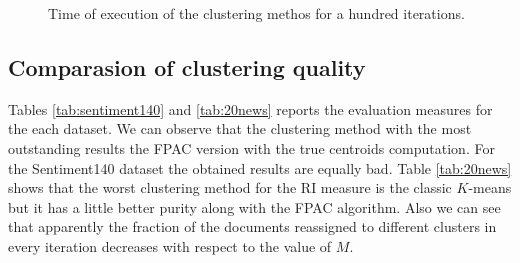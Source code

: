 \documentclass[runningheads]{llncs}
\begin{document}
\begin{figure}
\centering
{}
\caption{Time of execution of the clustering methos for a hundred iterations.}
\label{fig:runtimes}
\end{figure}

\subsection{Comparasion of clustering quality}

Tables \ref{tab:sentiment140} and \ref{tab:20news}
reports the evaluation measures for the each 
dataset.
We can observe that the clustering method with the
most outstanding results the FPAC version with the
true centroids computation.
For the Sentiment140 dataset the obtained
results are equally bad. 
Table \ref{tab:20news} shows that the worst 
clustering method for the RI measure is 
the classic $K$-means but it has a little better purity
along with the FPAC algorithm.
Also we can see that apparently the fraction of the documents reassigned to different clusters in every iteration decreases with respect to the value of $M$.
\end{document}
